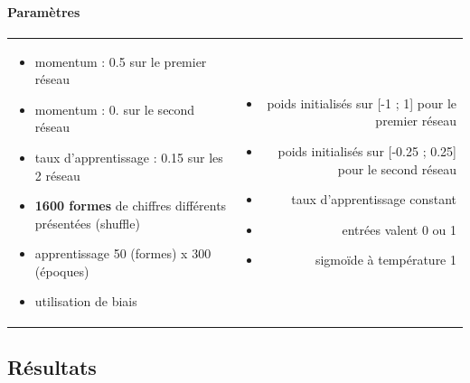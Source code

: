     \paragraph{Paramètres}
      \begin{center}
	\begin{tabular}{lr}
	  \begin{minipage}{230px}
	    \begin{itemize}
	      \item momentum : 0.5 sur le premier réseau
	      \item momentum : 0. sur le second réseau
	      \item taux d'apprentissage : 0.15 sur les 2 réseau
	      \item \textbf{1600 formes} de chiffres différents présentées (shuffle) \cite{Handwritten_256}
	      \item apprentissage 50 (formes) x 300 (époques)
	      \item utilisation de biais
	      
	    \end{itemize}
	  \end{minipage}
	  &
	  \begin{minipage}{230px}
	    \begin{itemize}
	      \item poids initialisés sur [-1 ; 1] pour le premier réseau
	      \item poids initialisés sur [-0.25 ; 0.25] pour le second réseau
	      \item taux d'apprentissage constant
	      \item entrées valent 0 ou 1
	      \item sigmoïde à température 1
	    \end{itemize}
	  \end{minipage}
	\end{tabular}
      \end{center}


  
  \newpage
  \subsection{Résultats}
